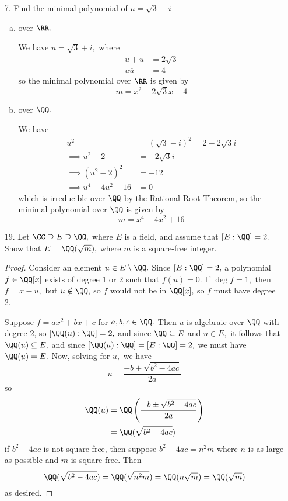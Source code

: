 \documentclass{article}
\begin{document}
\begin{itemize}
	\item[7.] Find the minimal polynomial of $u=\sqrt{3}-i$
		\begin{enumerate}[(a)]
			\item over $\RR.$
				\begin{soln}
					We have $\overline{u}=\sqrt{3}+i,$ where
					\begin{align*}
						u+\overline{u} &= 2\sqrt{3} \\
						u\overline{u} &= 4
					\end{align*}
					so the minimal polynomial over $\RR$ is given by
					\[m=x^2-2\sqrt{3} x + 4\]
				\end{soln}

			\item over $\QQ.$
				\begin{soln}
					We have
					\begin{align*}
						u^2 &= (\sqrt{3}-i)^2 = 2-2\sqrt{3}i \\
						\implies u^2-2 &= -2\sqrt{3} i \\
						\implies (u^2-2)^2 &= -12 \\
						\implies u^4-4u^2+16 &= 0
					\end{align*}
					which is irreducible over $\QQ$ by the Rational Root Theorem, so the minimal polynomial over $\QQ$ is given by
					\[m=x^4-4x^2+16\]
				\end{soln}
				
		\end{enumerate}

	\item[19.] Let $\CC\supseteq E\supseteq \QQ,$ where $E$ is a field, and assume that $[E:\QQ]=2.$ Show that $E=\QQ(\sqrt{m}),$ where $m$ is a square-free integer.
		\begin{proof}
			Consider an element $u\in E\setminus\QQ.$ Since $[E:\QQ]=2,$ a polynomial $f\in \QQ[x]$ exists of degree 1 or 2 such that $f(u)=0.$ If $\deg f=1,$ then $f=x-u,$ but $u\notin\QQ,$ so $f$ would not be in $\QQ[x],$ so $f$ must have degree 2.

			Suppose $f=ax^2+bx+c$ for $a, b, c\in\QQ.$ Then $u$ is algebraic over $\QQ$ with degree 2, so $[\QQ(u):\QQ]=2,$ and since $\QQ\subseteq E$ and $u\in E,$ it follows that $\QQ(u)\subseteq E,$ and since $[\QQ(u):\QQ]=[E:\QQ]=2,$ we must have $\QQ(u)=E.$ Now, solving for $u,$ we have
			\[u=\frac{-b\pm \sqrt{b^2-4ac}}{2a}\]
			so
			\begin{align*}
				\QQ(u) &= \QQ\left( \frac{-b\pm \sqrt{b^2-4ac}}{2a} \right) \\
				&= \QQ(\sqrt{b^2-4ac})
			\end{align*}
			if $b^2-4ac$ is not square-free, then suppose $b^2-4ac=n^2m$ where $n$ is as large as possible and $m$ is square-free. Then
			\[\QQ(\sqrt{b^2-4ac}) = \QQ(\sqrt{n^2m}) = \QQ(n\sqrt{m}) = \QQ(\sqrt{m})\]
			as desired.
		\end{proof}


\end{itemize}
\end{document}
